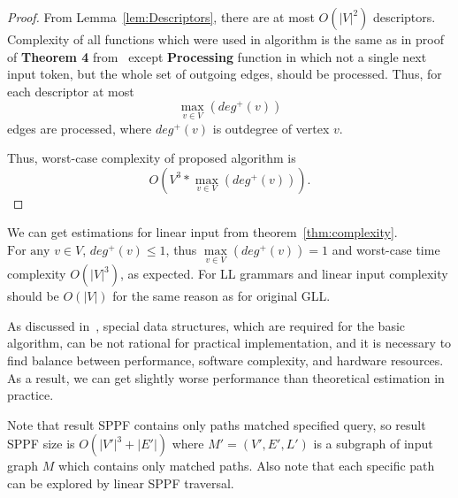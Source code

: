 \begin{proof}

From Lemma~\ref{lem:Descriptors}, there are at most $O(|V|^2)$ descriptors. 
Complexity of all functions which were used in algorithm is the same as in proof of \textbf{Theorem 4} from~\cite{gllParsingTree} except \textbf{Processing} function in which not a single next input token, but the whole set of outgoing edges, should be processed.
Thus, for each descriptor at most $$\max\limits_{v \in V}\left(deg^+\left(v\right)\right)$$ edges  are processed, where $deg^+(v)$ is outdegree of vertex $v$.

Thus, worst-case complexity of proposed algorithm is $$O\left(V^3*\max\limits_{v \in V}\left(deg^+\left(v\right)\right)\right).$$
\end{proof}


We can get estimations for linear input from theorem~\ref{thm:complexity}. $\text{For any } v \in V$, $deg^+(v) \leq 1$, thus $\max\limits_{v \in V}(deg^+(v))  = 1 $ and worst-case time complexity $O(|V|^3)$, as expected. 
For LL grammars and linear input complexity should be $O(|V|)$ for the same reason as for original GLL.
 
As discussed in~\cite{modellingGLL}, special data structures, which are required for the basic algorithm, can be not rational for practical implementation, and it is necessary to find balance between performance, software complexity, and hardware resources.
As a result, we can get slightly worse performance than theoretical estimation in practice.

Note that result SPPF contains only paths matched specified query, so result SPPF size is $O(|V'|^3 + |E'|)$ where $M'=(V',E',L')$ is a subgraph of input graph $M$ which contains only matched paths.
Also note that each specific path can be explored by linear SPPF traversal. 
